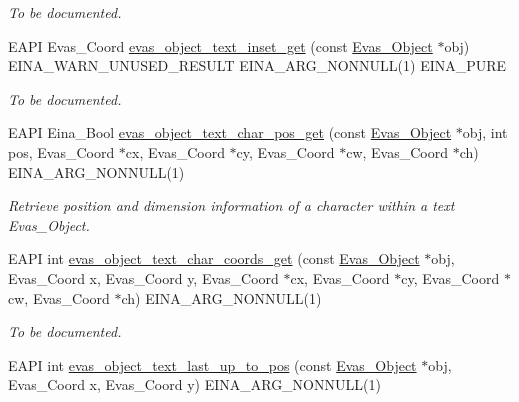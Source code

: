 \begin{DoxyCompactItemize}
\begin{DoxyCompactList}\small\item\em To be documented. \item\end{DoxyCompactList}\item 
EAPI Evas\_\-Coord \hyperlink{group__Evas__Object__Text_ga6c5f45ff6e1be091d0382db0ccfb919d}{evas\_\-object\_\-text\_\-inset\_\-get} (const \hyperlink{group__Evas__Object__Group_ga9e19e6dd1f517a0ba437c0114d3e7c97}{Evas\_\-Object} $\ast$obj) EINA\_\-WARN\_\-UNUSED\_\-RESULT EINA\_\-ARG\_\-NONNULL(1) EINA\_\-PURE
\begin{DoxyCompactList}\small\item\em To be documented. \item\end{DoxyCompactList}\item 
EAPI Eina\_\-Bool \hyperlink{group__Evas__Object__Text_ga823b09a9d05a1650e63970e329cd7b72}{evas\_\-object\_\-text\_\-char\_\-pos\_\-get} (const \hyperlink{group__Evas__Object__Group_ga9e19e6dd1f517a0ba437c0114d3e7c97}{Evas\_\-Object} $\ast$obj, int pos, Evas\_\-Coord $\ast$cx, Evas\_\-Coord $\ast$cy, Evas\_\-Coord $\ast$cw, Evas\_\-Coord $\ast$ch) EINA\_\-ARG\_\-NONNULL(1)
\begin{DoxyCompactList}\small\item\em Retrieve position and dimension information of a character within a text {\ttfamily Evas\_\-Object}. \item\end{DoxyCompactList}\item 
EAPI int \hyperlink{group__Evas__Object__Text_gab37f85358bd7d333cd6e8c7cf62b5daa}{evas\_\-object\_\-text\_\-char\_\-coords\_\-get} (const \hyperlink{group__Evas__Object__Group_ga9e19e6dd1f517a0ba437c0114d3e7c97}{Evas\_\-Object} $\ast$obj, Evas\_\-Coord x, Evas\_\-Coord y, Evas\_\-Coord $\ast$cx, Evas\_\-Coord $\ast$cy, Evas\_\-Coord $\ast$cw, Evas\_\-Coord $\ast$ch) EINA\_\-ARG\_\-NONNULL(1)
\begin{DoxyCompactList}\small\item\em To be documented. \item\end{DoxyCompactList}\item 
EAPI int \hyperlink{group__Evas__Object__Text_ga464d40578e2fdc2ad8890556e0b97268}{evas\_\-object\_\-text\_\-last\_\-up\_\-to\_\-pos} (const \hyperlink{group__Evas__Object__Group_ga9e19e6dd1f517a0ba437c0114d3e7c97}{Evas\_\-Object} $\ast$obj, Evas\_\-Coord x, Evas\_\-Coord y) EINA\_\-ARG\_\-NONNULL(1)

\end{DoxyCompactItemize}
